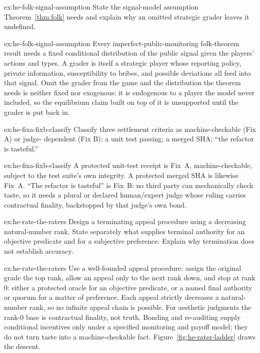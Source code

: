 \documentclass[11pt,a4paper]{article}
\theoremstyle{definition}
\theoremstyle{definition}
\theoremstyle{remark}
\begin{document}
\begin{pdexercise}[kind=Check,rating=1]{ex:he-folk-signal-assumption}
State the signal-model assumption Theorem~\ref{thm:folk} needs and explain
  why an omitted strategic grader leaves it undefined.
\end{pdexercise}
\begin{pdsolution}{ex:he-folk-signal-assumption}
Every imperfect-public-monitoring folk-theorem result needs a fixed
conditional distribution of the public signal given the players' actions and
types. A grader is itself a strategic player whose reporting policy, private
information, susceptibility to bribes, and possible deviations all feed into
that signal. Omit the grader from the game and the distribution the theorem
needs is neither fixed nor exogenous: it is endogenous to a player the model
never included, so the equilibrium claim built on top of it is unsupported until
the grader is put back in.
\end{pdsolution}
\begin{pdexercise}[kind=Check,rating=1]{ex:he-fixa-fixb-classify}
Classify three settlement criteria as machine-checkable (Fix A) or judge-
  dependent (Fix B): a unit test passing; a merged SHA; ``the refactor is
  tasteful.''
\end{pdexercise}
\begin{pdsolution}{ex:he-fixa-fixb-classify}
A protected unit-test receipt is Fix~A, machine-checkable, subject to the
test suite's own integrity. A protected merged SHA is likewise Fix~A. ``The
refactor is tasteful'' is Fix~B: no third party can mechanically check taste, so
it needs a plural or declared human/expert judge whose ruling carries
contractual finality, backstopped by that judge's own bond.
\end{pdsolution}
\begin{pdexercise}[kind=Open,rating=3]{ex:he-rate-the-raters}
Design a terminating appeal procedure using a decreasing natural-number
rank. State separately what supplies terminal authority for an objective
predicate and for a subjective preference. Explain why termination does
not establish accuracy.
\end{pdexercise}
\begin{pdsolution}{ex:he-rate-the-raters}
Use a well-founded appeal procedure: assign the original grade the top rank, allow an appeal only to the
next rank down, and stop at rank $0$: either a protected oracle for an objective
predicate, or a named final authority or quorum for a matter of preference.
Each appeal strictly decreases a natural-number rank, so no infinite appeal
chain is possible. For aesthetic judgments the rank-$0$ base is
contractual finality, not truth. Bonding and re-auditing supply conditional
incentives only under a specified monitoring and payoff model; they do not
turn taste into a machine-checkable fact. Figure~\ref{fig:he-rater-ladder} draws the descent.


\end{pdsolution}
\end{document}
